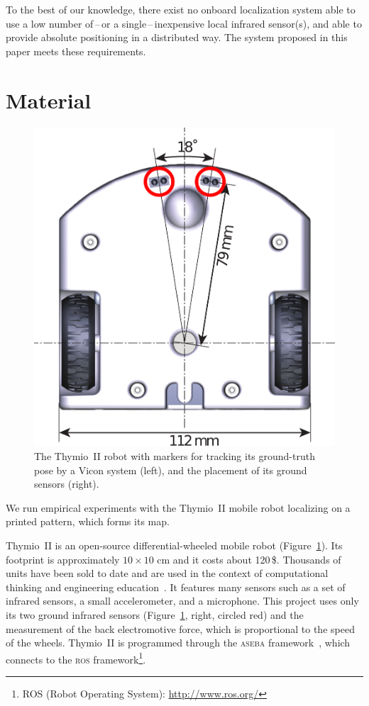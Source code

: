 \documentclass[letterpaper, 10pt, conference]{ieeeconf}
\newcommand{\fig}[1]{Figure~\ref{fig:#1}}
\begin{document}
To the best of our knowledge, there exist no onboard localization system able to use a low number of\,--\,or a single\,--\,inexpensive local infrared sensor(s), and able to provide absolute positioning in a distributed way.
The system proposed in this paper meets these requirements.

\section{Material}
\begin{figure}
\hfill
\includegraphics[width=.43\columnwidth]{thymio2-dimensions}
\vspace{-.07cm}
\caption{The Thymio~II robot with markers for tracking its ground-truth pose by a Vicon system (left), and the placement of its ground sensors (right).}
\label{fig:thymio}
\end{figure}

We run empirical experiments with the Thymio~II mobile robot localizing on a printed pattern, which forms its map.

Thymio~II is an open-source differential-wheeled mobile robot (\fig{thymio}).
Its footprint is approximately $10 \times 10$ cm and it costs about 120\,\$.
Thousands of units have been sold to date and are used in the context of computational thinking and engineering education~\cite{riedo2015thymio}.
It features many sensors such as a set of infrared sensors, a small accelerometer, and a microphone.
This project uses only its two ground infrared sensors (\fig{thymio}, right, circled red) and the measurement of the back electromotive force, which is proportional to the speed of the wheels.
Thymio~II is programmed through the \textsc{aseba} framework~\cite{aseba2011tmech}, which connects to the \textsc{ros} framework\footnote{ROS (Robot Operating System): \url{http://www.ros.org/}}.
\end{document}
